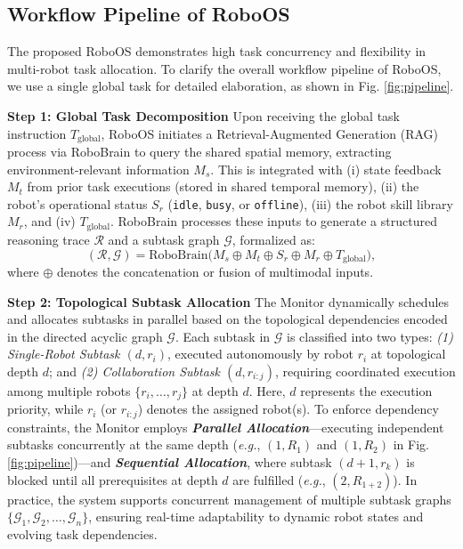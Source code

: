 \subsection{Workflow Pipeline of RoboOS}
\label{subsec:pipeline}
The proposed RoboOS demonstrates high task concurrency and flexibility in multi-robot task allocation. To clarify the overall workflow pipeline of RoboOS, we use a single global task for detailed elaboration, as shown in Fig. \ref{fig:pipeline}.

\textbf{Step 1: Global Task Decomposition} Upon receiving the global task instruction \( T_{\text{global}} \), RoboOS initiates a Retrieval-Augmented Generation (RAG) process via RoboBrain to query the shared spatial memory, extracting environment-relevant information \( M_s \). This is integrated with (i) state feedback \( M_t \) from prior task executions (stored in shared temporal memory), (ii) the robot’s operational status \( S_r \) (\texttt{idle}, \texttt{busy}, or \texttt{offline}), (iii) the robot skill library \( M_r \), and (iv) \( T_{\text{global}} \). RoboBrain processes these inputs to generate a structured reasoning trace \( \mathcal{R} \) and a subtask graph \( \mathcal{G} \), formalized as: 
\begin{equation}
    (\mathcal{R}, \mathcal{G}) = \text{RoboBrain}\big(M_s \oplus M_t \oplus S_r \oplus M_r \oplus T_{\text{global}}\big),
\end{equation}
where \( \oplus \) denotes the concatenation or fusion of multimodal inputs.

\textbf{Step 2: Topological Subtask Allocation} 
The Monitor dynamically schedules and allocates subtasks in parallel based on the topological dependencies encoded in the directed acyclic graph \( \mathcal{G} \). 
Each subtask in \( \mathcal{G} \) is classified into two types: \textit{(1) Single-Robot Subtask \((d, r_i)\)}, executed autonomously by robot \( r_i \) at topological depth \( d \); and \textit{(2) Collaboration Subtask \((d, r_{i:j})\)}, requiring coordinated execution among multiple robots \(\{r_i, \dots, r_j\}\) at depth \( d \). Here, \( d \) represents the execution priority, while \( r_i \) (or \( r_{i:j} \)) denotes the assigned robot(s). 
To enforce dependency constraints, the Monitor employs \textit{\textbf{Parallel Allocation}}—executing independent subtasks concurrently at the same depth (\textit{e.g.}, \((1, R_1)\) and \((1, R_2)\) in Fig. \ref{fig:pipeline})—and \textit{\textbf{Sequential Allocation}}, where subtask \((d+1, r_k)\) is blocked until all prerequisites at depth \( d \) are fulfilled (\textit{e.g.}, \((2, R_{1+2})\)). 
In practice, the system supports concurrent management of multiple subtask graphs \(\{ \mathcal{G}_1, \mathcal{G}_2, \dots, \mathcal{G}_n \}\), ensuring real-time adaptability to dynamic robot states and evolving task dependencies.

